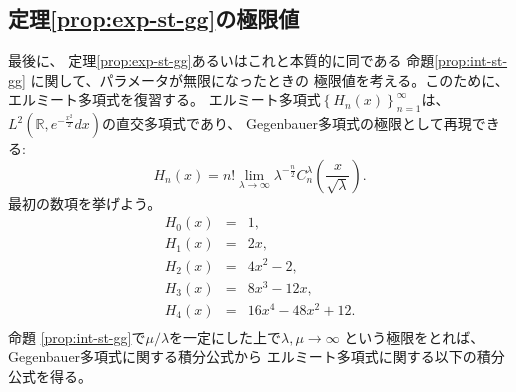 \subsection{定理\ref{prop:exp-st-gg}の極限値}
最後に、
定理\ref{prop:exp-st-gg}あるいはこれと本質的に同である
命題\ref{prop:int-st-gg}
に関して、パラメータが無限になったときの
極限値を考える。このために、
エルミート多項式を復習する。
エルミート多項式$\left\{ H_n(x) \right\}_{n=1}^\infty$は、
	$L^2\left( \mathbb{R},e^{-\frac{x^2}{2}}dx \right)$の直交多項式であり、
	Gegenbauer多項式の極限として再現できる:
	\begin{equation*}
			H_n (x) = n! \lim_{\lambda \rightarrow \infty} \lambda^{- \frac{n}{2}}
			C_n^{\lambda} \left( \frac{x}{\sqrt{\lambda}} \right).
	\end{equation*}
	最初の数項を挙げよう。
		\begin{eqnarray*}
		H_0(x)&=& 1,\\
		H_1(x)&=& 2x,\\
		H_2(x)&=& 
		4x^2-2,\\
		H_3(x)&=& 8x^3-12x,\\
		H_4(x)&=& 16x^4-48x^2+12.\\
		\end{eqnarray*}
	命題 \ref{prop:int-st-gg}で$\mu/\lambda$を一定にした上で$\lambda,\mu\to\infty$ 
	という極限をとれば、Gegenbauer多項式に関する積分公式から
	エルミート多項式に関する以下の積分公式を得る。
